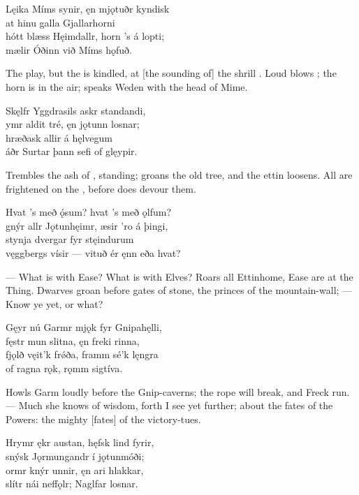 \bva Lęika Míms synir, \hld ęn mjǫtuðr kyndisk \\%
at hinu galla \hld Gjallarhorni \\%
hótt blæss Hęimdallr, \hld horn ’s á lopti; \\%
mælir Óðinn \hld við Míms hǫfuð.\eva

\bvb The  play, but the  is kindled, at [the sounding of] the shrill . Loud blows ; the horn is in the air; speaks Weden with the head of Mime.\evb

\bva Skęlfr Yggdrasils \hld askr standandi, \\%
ymr aldit tré, \hld ęn jǫtunn losnar; \\%
hræðask allir \hld á hęlvegum \\%
áðr Surtar þann \hld sefi of glęypir.\eva

\bvb Trembles the ash of , standing; groans the old tree, and the ettin loosens. All are frightened on the , before  does devour them.\evb

\bva Hvat ’s með ǫ́sum? \hld hvat ’s með ǫlfum? \\%
gnýr allr Jǫtunhęimr, \hld æsir ’ro á þingi, \\%
stynja dvergar \hld fyr stęindurum \\%
vęggbergs vísir — \hld vituð ér ęnn eða hvat?\eva

\bvb — What is with Ease? What is with Elves? Roars all Ettinhome, Ease are at the Thing. Dwarves groan before gates of stone, the princes of the mountain-wall; — Know ye yet, or what?\evb

\bva Gęyr nú Garmr mjǫk \hld fyr Gnipahęlli, \\%
fęstr mun slitna, \hld ęn freki rinna, \\%
fjǫlð vęit’k frǿða, \hld framm sé’k lęngra \\%
of ragna rǫk, \hld rǫmm sigtíva.\eva

\bvb Howls Garm loudly before the Gnip-caverns; the rope will break, and Freck run. — Much she knows of wisdom, forth I see yet further; about the fates of the Powers: the mighty [fates] of the victory-tues.\evb

\bva Hrymr ękr austan, \hld hęfsk lind fyrir, \\%
snýsk Jǫrmungandr \hld í jǫtunmóði; \\%
ormr knýr unnir, \hld ęn ari hlakkar, \\%
slítr nái neffǫlr; \hld Naglfar losnar.\eva

